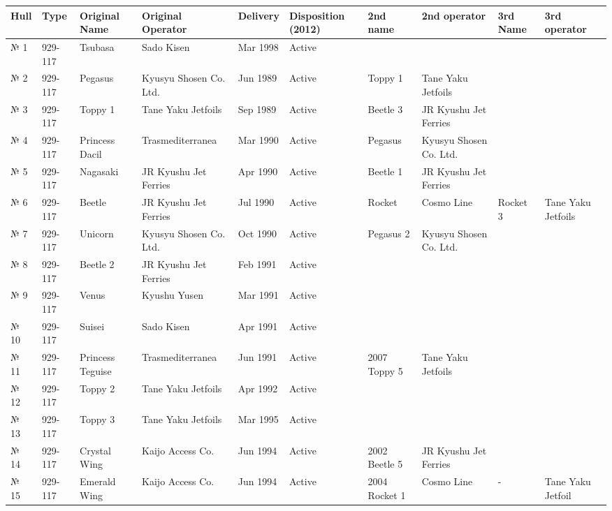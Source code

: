 \documentclass{article}
\begin{document}
\begin{tabular}{llllllllll}
\toprule
Hull & Type & Original Name & Original Operator & Delivery & Disposition (2012) & 2nd name & 2nd operator & 3rd Name & 3rd operator \\
\midrule
№ 1 & 929-117 & Tsubasa & Sado Kisen & Mar 1998 & Active &  &  &  &  \\
№ 2 & 929-117 & Pegasus & Kyusyu Shosen Co. Ltd. & Jun 1989 & Active & Toppy 1 & Tane Yaku Jetfoils &  &  \\
№ 3 & 929-117 & Toppy 1 & Tane Yaku Jetfoils & Sep 1989 & Active & Beetle 3 & JR Kyushu Jet Ferries &  &  \\
№ 4 & 929-117 & Princess Dacil & Trasmediterranea & Mar 1990 & Active & Pegasus & Kyusyu Shosen Co. Ltd. &  &  \\
№ 5 & 929-117 & Nagasaki & JR Kyushu Jet Ferries & Apr 1990 & Active & Beetle 1 & JR Kyushu Jet Ferries &  &  \\
№ 6 & 929-117 & Beetle & JR Kyushu Jet Ferries & Jul 1990 & Active & Rocket & Cosmo Line & Rocket 3 & Tane Yaku Jetfoils \\
№ 7 & 929-117 & Unicorn & Kyusyu Shosen Co. Ltd. & Oct 1990 & Active & Pegasus 2 & Kyusyu Shosen Co. Ltd. &  &  \\
№ 8 & 929-117 & Beetle 2 & JR Kyushu Jet Ferries & Feb 1991 & Active &  &  &  &  \\
№ 9 & 929-117 & Venus & Kyushu Yusen & Mar 1991 & Active &  &  &  &  \\
№ 10 & 929-117 & Suisei & Sado Kisen & Apr 1991 & Active &  &  &  &  \\
№ 11 & 929-117 & Princess Teguise & Trasmediterranea & Jun 1991 & Active & 2007 Toppy 5 & Tane Yaku Jetfoils &  &  \\
№ 12 & 929-117 & Toppy 2 & Tane Yaku Jetfoils & Apr 1992 & Active &  &  &  &  \\
№ 13 & 929-117 & Toppy 3 & Tane Yaku Jetfoils & Mar 1995 & Active &  &  &  &  \\
№ 14 & 929-117 & Crystal Wing & Kaijo Access Co. & Jun 1994 & Active & 2002 Beetle 5 & JR Kyushu Jet Ferries &  &  \\
№ 15 & 929-117 & Emerald Wing & Kaijo Access Co. & Jun 1994 & Active & 2004 Rocket 1 & Cosmo Line & - & Tane Yaku Jetfoil \\
\bottomrule
\end{tabular}
\end{document}
